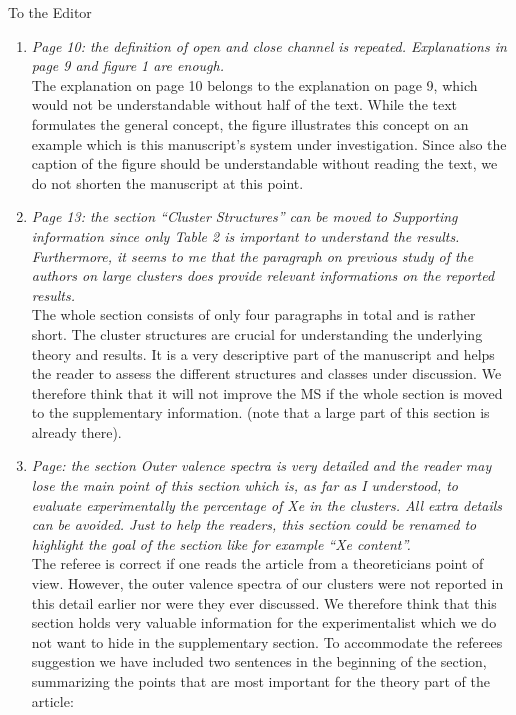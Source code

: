 \documentclass[DIN,pagenumber=false,parskip=half,fromalign=left,fromphone=true,fromemail=true,fromurl=false,fromlogo=false,fromrule=false]{scrlttr2}
\begin{document}
\begin{letter}{To the Editor}
\begin{enumerate}
\begin{enumerate}
   \item \emph{Page 10: the definition of open and close channel is repeated. Explanations in page 9 and figure 1 are enough.}\vspace{0.3cm}\\
         The explanation on page 10 belongs to the explanation on page 9, which
         would not be understandable without half of the text. While the
         text formulates the general concept, the figure illustrates this concept
         on an example which is this manuscript's system under investigation.
         Since also the caption of the figure should be understandable without
         reading the text, we do not shorten the manuscript at this point.

   \item \emph{Page 13:
         the section “Cluster Structures” can be moved to Supporting information since only Table 2 is important to understand the results. Furthermore, it seems to me that the paragraph on previous study of the authors on large clusters does provide relevant informations on the reported results.}\vspace{0.3cm}\\
     The whole section consists of only four paragraphs in total and is rather short. The cluster structures are crucial for understanding the underlying theory and results. It is a very descriptive part of the manuscript and helps the reader to assess the different structures and classes under discussion. We therefore think that it will not improve the MS if the whole section is moved to the supplementary information. (note that a large part of this section is already there).

   \item \emph{Page:
         the section Outer valence spectra is very detailed and the reader may lose the main point of this section which is, as far as I understood, to evaluate experimentally the percentage of Xe in the clusters. All extra details can be avoided. Just to help the readers, this section could be renamed to highlight the goal of the section like for example “Xe content”.}\vspace{0.3cm}\\
				The referee is correct if one reads the article from a theoreticians point of view. However, the outer valence spectra of our clusters were not reported in this detail earlier nor were they ever discussed. We therefore think that this section holds very valuable information for the experimentalist which we do not want to hide in the supplementary section. To accommodate the referees suggestion we have included two sentences in the beginning of the section, summarizing the points that are most important for the theory part of the article: {\color{blue}{This section describes and discusses the outer valence spectra of the mixed Ar-Xe clusters. The main information we obtain from these spectra within the context of our theoretical considerations are
the single ionization potentials and
the relative Xe contents in the mixed cluster.}}
				

\end{enumerate}
\end{enumerate}
\end{letter}
\end{document}
